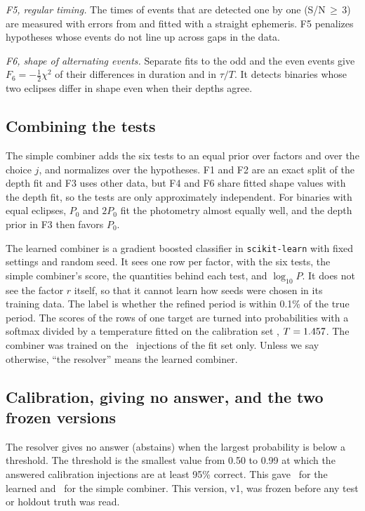 \documentclass[twocolumn,linenumbers]{aastex701}
\newcommand{\Pz}{P_0}
\newcommand{\Vone}{v1}
\begin{document}
\emph{F5, regular timing.} The times of events that are detected one by one (S/N\,$\ge$\,3) are measured with errors from \citet{Carter2008} and fitted with a straight ephemeris. F5 penalizes hypotheses whose events do not line up across gaps in the data.

\emph{F6, shape of alternating events.} Separate fits to the odd and the even events give $F_6 = -\tfrac{1}{2}\chi^2$ of their differences in duration and in $\tau/T$. It detects binaries whose two eclipses differ in shape even when their depths agree.

\subsection{Combining the tests} \label{sec:combine}

The simple combiner adds the six tests to an equal prior over factors and over the choice $j$, and normalizes over the hypotheses. F1 and F2 are an exact split of the depth fit and F3 uses other data, but F4 and F6 share fitted shape values with the depth fit, so the tests are only approximately independent. For binaries with equal eclipses, $\Pz$ and $2\Pz$ fit the photometry almost equally well, and the depth prior in F3 then favors $\Pz$.

The learned combiner is a gradient boosted classifier \citep{Friedman2001} in \texttt{scikit-learn} \citep{Pedregosa2011} with fixed settings and random seed. It sees one row per factor, with the six tests, the simple combiner's score, the quantities behind each test, and $\log_{10}P$. It does not see the factor $r$ itself, so that it cannot learn how seeds were chosen in its training data. The label is whether the refined period is within 0.1\% of the true period. The scores of the rows of one target are turned into probabilities with a softmax divided by a temperature fitted on the calibration set \citep{Guo2017}, $T=1.457$. The combiner was trained on the \bOneInjFit\ injections of the fit set only. Unless we say otherwise, ``the resolver'' means the learned combiner.

\subsection{Calibration, giving no answer, and the two frozen versions} \label{sec:calib}

The resolver gives no answer (abstains) when the largest probability is below a threshold. The threshold is the smallest value from 0.50 to 0.99 at which the answered calibration injections are at least 95\% correct. This gave \thrVoneLearned\ for the learned and \thrVonePrincipled\ for the simple combiner. This version, \Vone, was frozen before any test or holdout truth was read.
\end{document}
